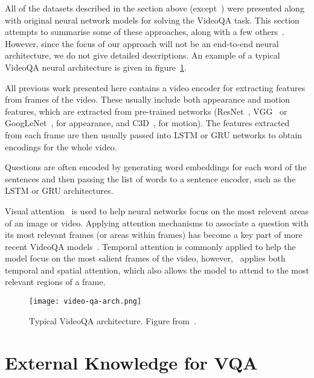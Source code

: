 \documentclass[../interim.tex]{subfiles}
\begin{document}
All of the datasets described in the section above (except~\cite{dataset:ego-vqa}) were presented along with original neural network models for solving the VideoQA task. This section attempts to summarise some of these approaches, along with a few others~\cite{videoqa:co-mem, videoqa:cwd, videoqa:mm-att, videoqa:strr}. However, since the focus of our approach will not be an end-to-end neural architecture, we do not give detailed descriptions. An example of a typical VideoQA neural architecture is given in figure~\ref{fig:video-qa-arch}.

All previous work presented here contains a video encoder for extracting features from frames of the video. These usually include both appearance and motion features, which are extracted from pre-trained networks (ResNet~\cite{resnet}, VGG~\cite{vgg} or GoogLeNet~\cite{googlenet}, for appearance, and C3D~\cite{c3d}, for motion). The features extracted from each frame are then usually passed into LSTM or GRU networks to obtain encodings for the whole video.

Questions are often encoded by generating word embeddings for each word of the sentences and then passing the list of words to a sentence encoder, such as the LSTM or GRU architectures.

Visual attention~\cite{visual-attention} is used to help neural networks focus on the most relevent areas of an image or video. Applying attention mechanisms to associate a question with its most relevant frames (or areas within frames) has become a key part of more recent VideoQA models~\cite{dataset:tgif-qa, dataset:xu, dataset:youtube2text-qa, dataset:tvqa, videoqa:co-mem, videoqa:cwd, videoqa:mm-att, dataset:pororo-qa}. Temporal attention is commonly applied to help the model focus on the most salient frames of the video, however,~\cite{dataset:tgif-qa} applies both temporal and spatial attention, which also allows the model to attend to the most relevant regions of a frame.

\begin{figure}
  \centering
  \texttt{[image: video-qa-arch.png]}
  \caption{Typical VideoQA architecture. Figure from~\cite{dataset:ego-vqa}.}
  \label{fig:video-qa-arch}
\end{figure}


\section{External Knowledge for VQA}
\end{document}
